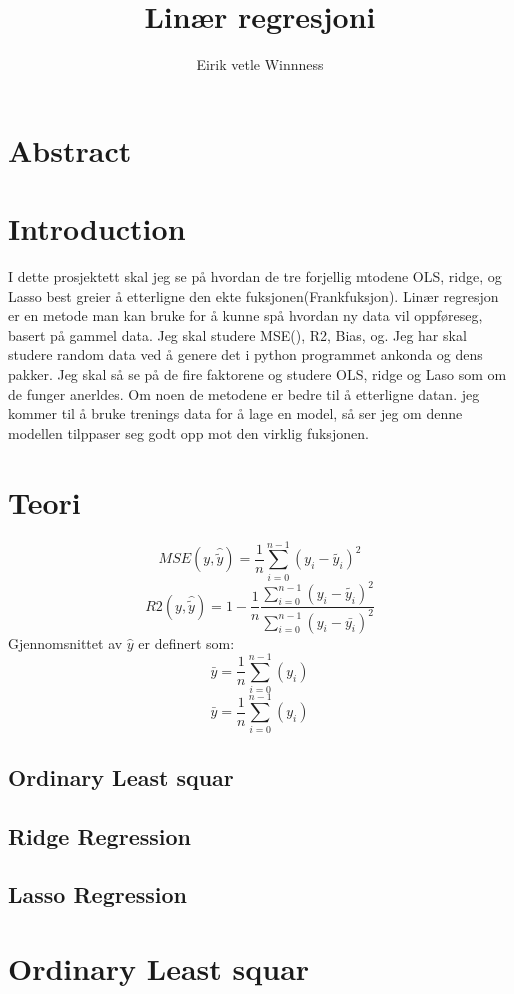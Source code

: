 \documentclass[norsk,a4paper,12pt]{article}
\begin{document}
\title{Linær regresjoni}
\author{Eirik vetle Winnness}
\maketitle 

\section*{Abstract}

\section*{Introduction}
I dette prosjektett skal jeg se på hvordan de tre forjellig mtodene OLS, ridge, og Lasso best greier å etterligne den ekte fuksjonen(Frankfuksjon). Linær regresjon er en metode man kan bruke for å kunne spå hvordan ny data vil oppføreseg, basert på gammel data. Jeg skal studere MSE(), R2, Bias, og. Jeg har skal studere random data ved å genere det i python programmet ankonda og dens pakker. Jeg skal så se på de fire faktorene og studere OLS, ridge og Laso som om de funger anerldes. Om noen de metodene er bedre til å etterligne datan. jeg kommer til å bruke trenings data for å lage en model, så ser jeg om denne modellen tilppaser seg godt opp mot den virklig fuksjonen. 
\section*{Teori}

\[ MSE(y,\hat{\widetilde{ y}}) =\frac{1}{n}\sum^{n-1}_{i=0}(y_i -\widetilde{ y_i})^2\]
\[ R2(y,\hat{\widetilde{ y}}) =1-\frac{1}{n}\frac{\sum^{n-1}_{i=0}(y_i -\widetilde{ y_i})^2}{\sum^{n-1}_{i=0}(y_i - \bar{y_i})^2} \]
Gjennomsnittet av $\hat{y}$ er definert som:\[\bar{y} =\frac{1}{n}\sum^{n-1}_{i=0}(y_i)\]
\[\bar{y} =\frac{1}{n}\sum^{n-1}_{i=0}(y_i)\]




\subsection*{ Ordinary Least squar}
\subsection*{ Ridge Regression}
\subsection*{Lasso Regression}
\section*{ Ordinary Least squar}
\end{document}
